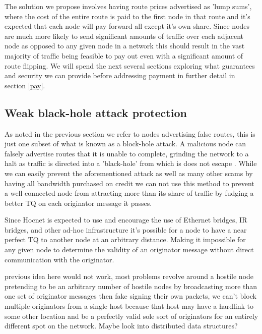 \documentclass[11pt]{article}
\begin{document}
               The solution we propose involves having route prices advertised as 'lump sums', where the cost of the entire route is paid to the first node in that route and it's expected that each node will pay forward all except it's own share. Since nodes are much more likely to send significant amounts of traffic over each adjacent node as opposed to any given node in a network this should result in the vast majority of traffic being feasible to pay out even with a significant amount of route flipping. We will spend the next several sections exploring what guarantees and security we can provide before addressing payment in further detail in section \ref{pay}.

    \subsection{Weak black-hole attack protection} \label{blackhole}
    
               As noted in the previous section we refer to nodes advertising false routes, this is just one subset of what is known as a block-hole attack. A malicious node can falsely advertise routes that it is unable to complete, grinding the network to a halt as traffic is directed into a 'black-hole' from which is does not escape \cite{routesec}. While we can easily prevent the aforementioned attack as well as many other scams by having all bandwidth purchased on credit we can not use this method to prevent a well connected node from attracting more than its share of traffic by fudging a better TQ on each originator message it passes.
               
               Since Hocnet is expected to use and encourage the use of Ethernet bridges, IR bridges, and other ad-hoc infrastructure it's possible for a node to have a near perfect TQ to another node at an arbitrary distance. Making it impossible for any given node to determine the validity of an originator message without direct communication with the originator.
               
               previous idea here would not work, most problems revolve around a hostile node pretending to be an arbitrary number of hostile nodes by broadcasting more than one set of originator messages then fake signing their own packets, we can't block multiple originators from a single host because that host may have a hardlink to some other location and be a perfectly valid sole sort of originators for an entirely different spot on the network. Maybe look into distributed data structures? 
    
\end{document}
